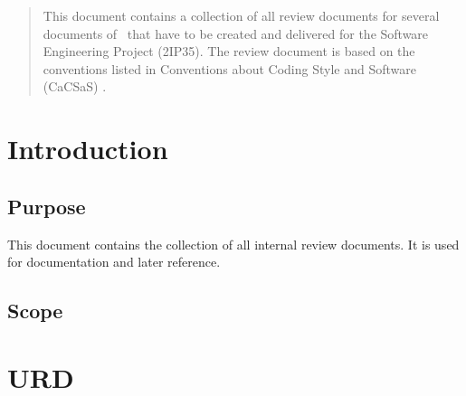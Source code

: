 
\renewcommand{\pathtobase}[1]{../#1}

\renewcommand{\TitelFull}{Review document}



\fingerpainttitlepage{}

\begin{abstract}
This document contains a collection of all review documents for several documents of \projectname\ that have to be created and delivered for the Software Engineering Project (2IP35). The review document is based on the conventions listed in Conventions about Coding Style and Software (CaCSaS) .
\end{abstract}

\tableofcontents

\chapter{Introduction}
\section{Purpose}
This document contains the collection of all internal review documents. It is used for documentation and later reference.

\section{Scope}

\chapter{URD}


